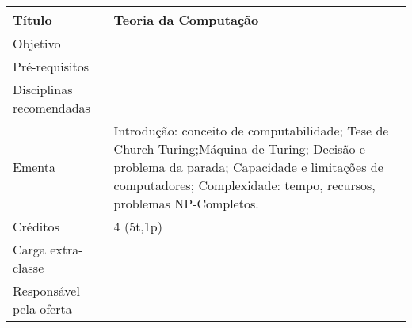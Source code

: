 \begin{tabular}{|p{4.5cm}|p{10.0cm}|} \hline

Título & Teoria da Computação \\ \hline

Objetivo &   \\ \hline

Pré-requisitos &  \\ \hline

Disciplinas recomendadas & \\ \hline

Ementa & Introdução: conceito de computabilidade; Tese de Church-Turing;Máquina de Turing; Decisão e problema da parada; Capacidade e limitações de computadores; Complexidade: tempo, recursos, problemas NP-Completos. \\ \hline

Créditos & 4 (5t,1p) \\ \hline
Carga extra-classe &  \\ \hline
Responsável pela oferta &  \\ \hline
\end{tabular}
\\
\\





